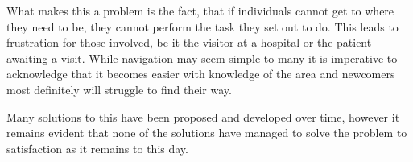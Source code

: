 What makes this a problem is the fact, that if individuals cannot get to where they need to be, they cannot perform the task they set out to do. This leads to frustration for those involved, be it the visitor at a hospital or the patient awaiting a visit. While navigation may seem simple to many it is imperative to acknowledge that it becomes easier with knowledge of the area and newcomers most definitely will struggle to find their way.

Many solutions to this have been proposed and developed over time, however it remains evident that none of the solutions have managed to solve the problem to satisfaction as it remains to this day.
